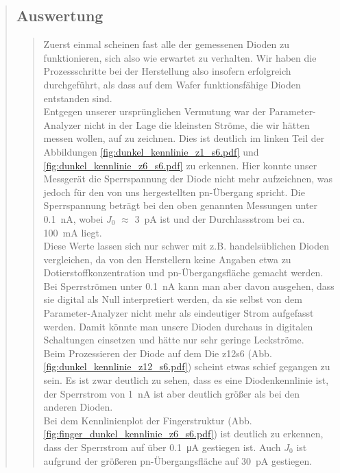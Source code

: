 \begin{quote}
    \subsection{Auswertung}
    \begin{quote}
        
        Zuerst einmal scheinen fast alle der gemessenen Dioden zu funktionieren, sich also wie erwartet zu verhalten.
        Wir haben die Prozessschritte bei der Herstellung also insofern erfolgreich durchgeführt, als dass auf dem Wafer
        funktionsfähige Dioden entstanden sind.\\
        Entgegen unserer ursprünglichen Vermutung war der Parameter-Analyzer nicht in der Lage die kleinsten Ströme, die
        wir hätten messen wollen, auf zu zeichnen. Dies ist deutlich im linken Teil der Abbildungen
        \ref{fig:dunkel_kennlinie_z1_s6.pdf} und \ref{fig:dunkel_kennlinie_z6_s6.pdf} zu erkennen. Hier konnte unser
        Messgerät die Sperrspannung der Diode nicht mehr aufzeichnen, was jedoch für den von uns hergestellten
        pn-Übergang spricht. Die Sperrspannung beträgt bei den oben genannten Messungen unter \SI{0,1}{\nano\ampere},
        wobei $J_0$ $\approx$ \SI{3}{\pico\ampere} ist und der Durchlassstrom bei ca. \SI{100}{\milli\ampere} liegt.
        \\
        Diese Werte lassen sich nur schwer mit z.B. handelsüblichen Dioden vergleichen, da von den Herstellern keine
        Angaben etwa zu Dotierstoffkonzentration und pn-Übergangsfläche gemacht werden. Bei Sperrströmen unter
        \SI{0,1}{\nano\ampere} kann man aber davon ausgehen, dass sie digital als Null interpretiert werden, da sie
        selbst von dem Parameter-Analyzer nicht mehr als eindeutiger Strom aufgefasst werden.
        Damit könnte man unsere Dioden durchaus in digitalen Schaltungen einsetzen und hätte nur sehr geringe Leckströme.\\
        
        Beim Prozessieren der Diode auf dem Die z12s6 (Abb. \ref{fig:dunkel_kennlinie_z12_s6.pdf}) scheint etwas schief
        gegangen zu sein. Es ist zwar deutlich zu sehen, dass es eine Diodenkennlinie ist, der Sperrstrom von
        \SI{1}{\nano\ampere} ist aber deutlich größer als bei den anderen Dioden.\\
        
        Bei dem Kennlinienplot der Fingerstruktur (Abb. \ref{fig:finger_dunkel_kennlinie_z6_s6.pdf}) ist deutlich zu
        erkennen, dass der Sperrstrom auf über \SI{0,1}{\micro\ampere} gestiegen ist. Auch $J_0$ ist aufgrund der
        größeren pn-Übergangsfläche auf \SI{30}{\pico\ampere} gestiegen.\\
        

\end{quote}
\end{quote}
